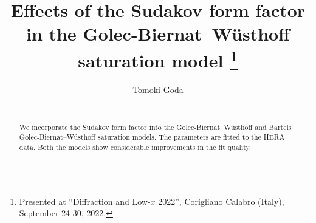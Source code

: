 \documentclass{appolb}
\begin{document}
\title{Effects of the Sudakov form factor in the Golec-Biernat--W\"usthoff saturation model
\thanks{Presented at ``Diffraction and Low-$x$ 2022'', Corigliano Calabro (Italy), September 24-30, 2022.}
}
\author{Tomoki Goda%
\address{H. Niewodniczański Institute of Nuclear Physics,\\
	Radzikowskiego 152, 31-342 Cracow, Poland}\\
}
\maketitle
\begin{abstract}
We incorporate  the Sudakov form factor into the Golec-Biernat--W\"usthoff and Bartels--Golec-Biernat--W\"usthoff saturation models. The parameters are fitted to the HERA data. Both the models show considerable improvements in the fit quality.
\end{abstract}
\end{document}
